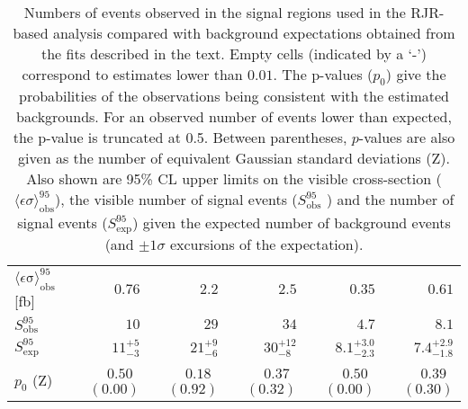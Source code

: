 \begin{table}[H]
\begin{center}
\begin{tabular}{|lrrrrr|}
$\langle\epsilon\mathrm{ \sigma}\rangle_\mathrm{ obs}^{95}$ [fb]   &$0.76$   & $2.2$ & $2.5$  & $0.35$ & $0.61$  \\
$S_\mathrm{ obs}^{95}$     & $10$ & $29$ &  $34$  & $4.7$ & $8.1$ \\
$S_\mathrm{ exp}^{95}$     & $ { 11 }^{ +5 }_{ -3 }$ &  $ { 21 }^{ +9 }_{ -6 }$ & $ { 30 }^{ +12 }_{ -8 }$ & $ { 8.1 }^{ +3.0 }_{ -2.3 }$ & $ { 7.4 }^{ +2.9 }_{ -1.8 }$ \\
$p_{0}$ ($\mathrm{Z}$)        & $ 0.50$~$(0.00)$  & $ 0.18$~$(0.92)$ & $ 0.37$~$(0.32)$ & $ 0.50$~$(0.00)$  & $ 0.39$~$(0.30)$ \\
\hline
\end{tabular}


\vspace*{-0.01\textheight}\caption[p0 and UL]{Numbers of events observed in the signal regions used in the RJR-based analysis compared with background expectations obtained from the fits described in the text. Empty cells (indicated by a `-') correspond to estimates lower than $0.01$.
The p-values ($p_{0}$) give the probabilities of the observations being consistent with the estimated backgrounds. For an observed number of events lower than expected, the p-value is truncated at 0.5. Between parentheses, $p$-values are also given as the number of equivalent Gaussian standard deviations (Z).
Also shown are 95\% CL upper limits on the visible cross-section ($\langle\epsilon\sigma\rangle_\mathrm{ obs}^{95}$),
the visible number of signal events ($S_\mathrm{ obs}^{95}$ ) and the number of signal events ($S_\mathrm{ exp}^{95}$)
given the expected number of background events (and $\pm 1\sigma$ excursions of the expectation).
\label{tab:p0_UL_RJR}}
\end{center}
\end{table}
